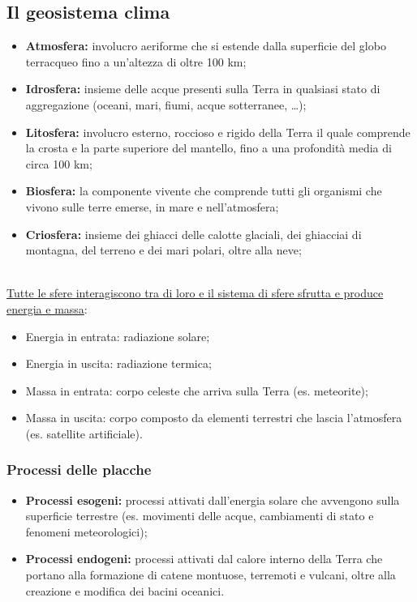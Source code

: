 \documentclass{article}
\begin{document}
\subsection{Il geosistema clima}
\begin{itemize}
    \item \textbf{Atmosfera:} involucro aeriforme che si estende dalla superficie del globo
        terracqueo fino a un’altezza di oltre 100 km;
    \item \textbf{Idrosfera:} insieme delle acque presenti sulla Terra in qualsiasi stato di
        aggregazione (oceani, mari, fiumi, acque sotterranee, …);
    \item \textbf{Litosfera:} involucro esterno, roccioso e rigido della Terra il quale
        comprende la crosta e la parte superiore del mantello, fino a una profondità media di
        circa 100 km;
    \item \textbf{Biosfera:} la componente vivente che comprende tutti gli organismi che vivono
        sulle terre emerse, in mare e nell’atmosfera;
    \item \textbf{Criosfera:} insieme dei ghiacci delle calotte glaciali, dei ghiacciai di
        montagna, del terreno e dei mari polari, oltre alla neve;
\end{itemize}
\phantom{}\\
\underline{Tutte le sfere interagiscono tra di loro e il sistema di sfere sfrutta e produce
energia e massa}:
\begin{itemize}
    \item Energia in entrata: radiazione solare;
    \item Energia in uscita: radiazione termica;
    \item Massa in entrata: corpo celeste che arriva sulla Terra (es. meteorite);
    \item Massa in uscita: corpo composto da elementi terrestri che lascia l'atmosfera
        (es. satellite artificiale).
\end{itemize}

\subsubsection{Processi delle placche}
\begin{itemize}
    \item \textbf{Processi esogeni:} processi attivati dall'energia solare che avvengono sulla
        superficie terrestre (es. movimenti delle acque, cambiamenti di stato e fenomeni
        meteorologici);
    \item \textbf{Processi endogeni:} processi attivati dal calore interno della Terra che
        portano alla formazione di catene montuose, terremoti e vulcani, oltre alla creazione
        e modifica dei bacini oceanici.
\end{itemize}
\end{document}
